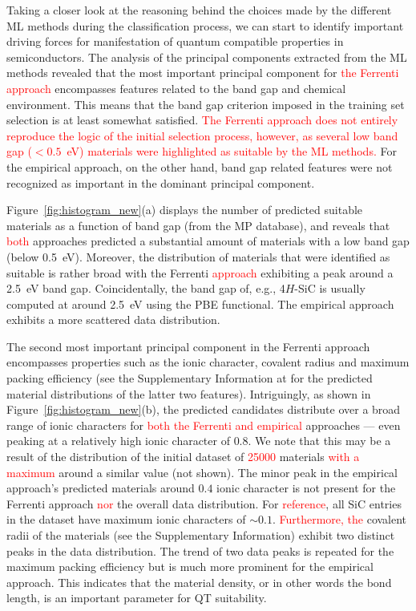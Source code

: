 \documentclass[superscriptaddress,unsortedaddress,
 amsmath,amssymb,
 aps,
]{revtex4-2}
\newcommand{\mrk}[1]{\textcolor{red}{#1}}
\begin{document}
Taking a closer look at the reasoning behind the choices made by the different ML methods during the classification process, we can start to identify important driving forces for manifestation of quantum compatible properties in semiconductors. 
The analysis of the principal components extracted from the ML methods revealed that the most important principal component for \mrk{the Ferrenti approach} encompasses features related to the band gap and chemical environment. This means that the band gap criterion imposed in the training set selection is at least somewhat satisfied. 
\mrk{The Ferrenti approach does not entirely reproduce the logic of the initial selection process, however, as several low band gap ($<0.5$~eV) materials were highlighted as suitable by the ML methods.}  
For the empirical approach, on the other hand, band gap related features were not recognized as important in the dominant principal component. 

Figure~\ref{fig:histogram_new}(a) displays the number of predicted suitable materials as a function of band gap (from the MP database), and reveals that \mrk{both} approaches predicted a substantial amount of materials with a low band gap (below \SI{0.5}{\electronvolt}). 
Moreover, the distribution of materials that were identified as suitable is rather broad with the Ferrenti \mrk{approach} exhibiting a peak around a \SI{2.5}{\electronvolt} band gap. 
Coincidentally, the band gap of, e.g., 4$H$-SiC is usually computed at around \SI{2.5}{\electronvolt} using the PBE functional. 
The empirical approach exhibits a more scattered data distribution. %

The second most important principal component in the Ferrenti approach encompasses properties such as the ionic character, covalent radius and maximum packing efficiency (see the Supplementary Information at \cite{supplementary} for the predicted material distributions of the latter two features).  
Intriguingly, as shown in  Figure~\ref{fig:histogram_new}(b), the predicted candidates distribute over a broad range of ionic characters for \mrk{both the Ferrenti and empirical} approaches --- even peaking at a relatively high ionic character of $0.8$. 
We note that this may be a result of the distribution of the initial dataset of \mrk{\num{25000}} materials \mrk{with a maximum} around a similar value (not shown). The minor peak in the empirical approach's predicted materials around $0.4$ ionic character is not present for the Ferrenti approach \mrk{nor} the overall data distribution. For \mrk{reference}, all SiC entries in the dataset have maximum ionic characters of $\sim 0.1$. 
\mrk{Furthermore, the} covalent radii of the materials (see the Supplementary Information) exhibit two distinct peaks in the data distribution. 
The trend of two data peaks is repeated for the maximum packing efficiency but is much more prominent for the empirical approach. This indicates that the material density, or in other words the bond length, is an important parameter for QT suitability.  
\end{document}
